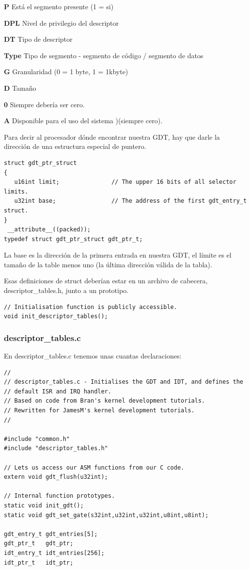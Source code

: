 \documentclass{report}
\begin{document}
\textbf{P} Está el segmento presente (1 = si)

\textbf{DPL} Nivel de privilegio del descriptor

\textbf{DT} Tipo de descriptor

\textbf{Type} Tipo de segmento - segmento de código / segmento de datos

\textbf{G} Granularidad (0 = 1 byte, 1 = 1kbyte)

\textbf{D} Tamaño

\textbf{0} Siempre debería ser cero.

\textbf{A} Disponible para el uso del sistema )(siempre cero).

Para decir al procesador dónde encontrar nuestra GDT, hay que darle la dirección de una estructura especial de puntero.

\begin{lstlisting}
struct gdt_ptr_struct
{
   u16int limit;               // The upper 16 bits of all selector limits.
   u32int base;                // The address of the first gdt_entry_t struct.
}
 __attribute__((packed));
typedef struct gdt_ptr_struct gdt_ptr_t;
\end{lstlisting}

La base es la dirección de la primera entrada en nuestra GDT, el límite es el tamaño de la table menos uno (la última dirección válida de la tabla).

Esas definiciones de struct deberían estar en un archivo de cabecera, descriptor\_tables.h, junto a un prototipo.

\begin{lstlisting}
// Initialisation function is publicly accessible.
void init_descriptor_tables();
\end{lstlisting}

\subsubsection{descriptor\_tables.c}

En descriptor\_tables.c tenemos unas cuantas declaraciones:

\begin{lstlisting}
//
// descriptor_tables.c - Initialises the GDT and IDT, and defines the 
// default ISR and IRQ handler.
// Based on code from Bran's kernel development tutorials.
// Rewritten for JamesM's kernel development tutorials.
//

#include "common.h"
#include "descriptor_tables.h"

// Lets us access our ASM functions from our C code.
extern void gdt_flush(u32int);

// Internal function prototypes.
static void init_gdt();
static void gdt_set_gate(s32int,u32int,u32int,u8int,u8int);

gdt_entry_t gdt_entries[5];
gdt_ptr_t   gdt_ptr;
idt_entry_t idt_entries[256];
idt_ptr_t   idt_ptr;
\end{lstlisting}
\end{document}
